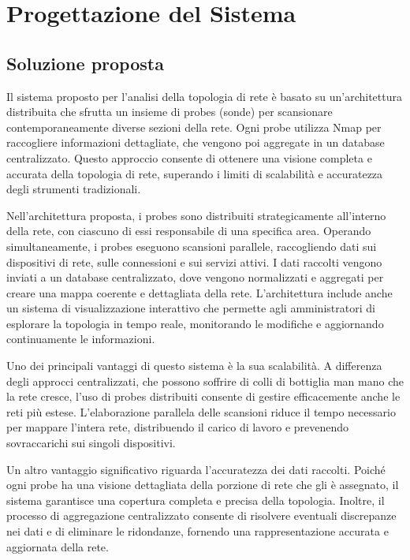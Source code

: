 \documentclass[target=bach,aauheader=,style=]{thud}
\begin{document}
\chapter{Progettazione del Sistema}

\section{Soluzione proposta}
Il sistema proposto per l'analisi della topologia di rete è basato su un'architettura distribuita che sfrutta un insieme di probes (sonde) per scansionare contemporaneamente diverse sezioni della rete. Ogni probe utilizza Nmap per raccogliere informazioni dettagliate, che vengono poi aggregate in un database centralizzato. Questo approccio consente di ottenere una visione completa e accurata della topologia di rete, superando i limiti di scalabilità e accuratezza degli strumenti tradizionali.

Nell'architettura proposta, i probes sono distribuiti strategicamente all'interno della rete, con ciascuno di essi responsabile di una specifica area. Operando simultaneamente, i probes eseguono scansioni parallele, raccogliendo dati sui dispositivi di rete, sulle connessioni e sui servizi attivi. I dati raccolti vengono inviati a un database centralizzato, dove vengono normalizzati e aggregati per creare una mappa coerente e dettagliata della rete. L'architettura include anche un sistema di visualizzazione interattivo che permette agli amministratori di esplorare la topologia in tempo reale, monitorando le modifiche e aggiornando continuamente le informazioni.

Uno dei principali vantaggi di questo sistema è la sua scalabilità. A differenza degli approcci centralizzati, che possono soffrire di colli di bottiglia man mano che la rete cresce, l'uso di probes distribuiti consente di gestire efficacemente anche le reti più estese. L'elaborazione parallela delle scansioni riduce il tempo necessario per mappare l'intera rete, distribuendo il carico di lavoro e prevenendo sovraccarichi sui singoli dispositivi.

Un altro vantaggio significativo riguarda l'accuratezza dei dati raccolti. Poiché ogni probe ha una visione dettagliata della porzione di rete che gli è assegnato, il sistema garantisce una copertura completa e precisa della topologia. Inoltre, il processo di aggregazione centralizzato consente di risolvere eventuali discrepanze nei dati e di eliminare le ridondanze, fornendo una rappresentazione accurata e aggiornata della rete.
\end{document}

